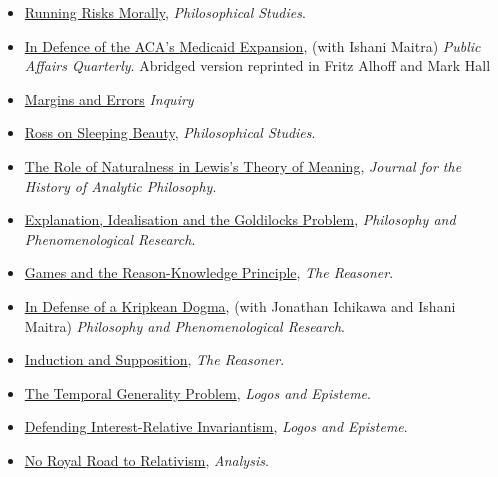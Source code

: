 \documentclass[
  10pt,
  letterpaper,
  DIV=11,
  numbers=noendperiod,
  twoside]{scrartcl}
\begin{document}
\begin{itemize}
\item
  \href{https://brian.weatherson.org/quarto/posts/rrm/running-risks-morally.html}{Running
  Risks Morally}, \emph{Philosophical Studies}.
\item
  \href{https://brian.weatherson.org/quarto/posts/aca/aca-medicaid.html}{In
  Defence of the ACA's Medicaid Expansion}, (with Ishani Maitra)
  \emph{Public Affairs Quarterly}. Abridged version reprinted in Fritz
  Alhoff and Mark Hall
\item
  \href{https://brian.weatherson.org/quarto/posts/mae/margins-and-errors.html}{Margins
  and Errors} \emph{Inquiry}
\item
  \href{https://brian.weatherson.org/quarto/posts/ross-sleeping-beauty/ross-on-sleeping-beauty.html}{Ross
  on Sleeping Beauty}, \emph{Philosophical Studies}.
\item
  \href{https://brian.weatherson.org/quarto/posts/naturalness/the-role-of-naturalness-in-lewiss-theory-of-meaning.html}{The
  Role of Naturalness in Lewis's Theory of Meaning}, \emph{Journal for
  the History of Analytic Philosophy}.
\item
  \href{https://brian.weatherson.org/quarto/posts/eigp/goldilocks.html}{Explanation,
  Idealisation and the Goldilocks Problem}, \emph{Philosophy and
  Phenomenological Research}.
\item
  \href{https://brian.weatherson.org/quarto/posts/gark/games-and-the-reason-knowledge-principle.html}{Games
  and the Reason-Knowledge Principle}, \emph{The Reasoner}.
\item
  \href{https://brian.weatherson.org/quarto/posts/idakd/in-defense-of-a-kripkean-dogma.html}{In
  Defense of a Kripkean Dogma}, (with Jonathan Ichikawa and Ishani
  Maitra) \emph{Philosophy and Phenomenological Research}.
\item
  \href{https://brian.weatherson.org/quarto/posts/ias/induction-and-supposition.html}{Induction
  and Supposition}, \emph{The Reasoner}.
\item
  \href{https://brian.weatherson.org/quarto/posts/tgp/the-temporal-generality-problem.html}{The
  Temporal Generality Problem}, \emph{Logos and Episteme}.
\item
  \href{https://brian.weatherson.org/quarto/posts/diri/defending-interest-relative-invariantism.html}{Defending
  Interest-Relative Invariantism}, \emph{Logos and Episteme}.
\item
  \href{https://brian.weatherson.org/quarto/posts/nrrtr/no-royal-road-to-relativism.html}{No
  Royal Road to Relativism}, \emph{Analysis}.

\end{itemize}
\end{document}
